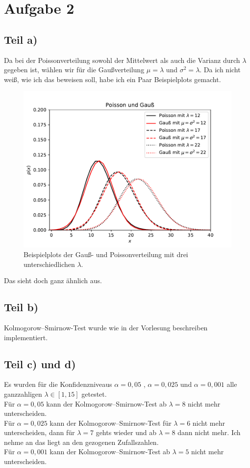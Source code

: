 \section{Aufgabe 2}
\label{sec:Aufgabe2}
\subsection{Teil a)}
Da bei der Poissonverteilung sowohl der Mittelwert als auch die Varianz
durch $\lambda$ gegeben
ist, wählen wir für die Gaußverteilung $\mu=\lambda$ und $\sigma^2=\lambda$.
Da ich nicht weiß, wie ich das beweisen soll, habe ich ein Paar Beispielplots gemacht.
\begin{figure}[H]
  \includegraphics{plots/testplot.pdf}
  \caption{Beispielplots der Gauß- und Poissonverteilung mit drei
            unterschiedlichen $\lambda$.}
\end{figure}
Das sieht doch ganz ähnlich aus.
\subsection{Teil b)}
Kolmogorow–Smirnow-Test wurde wie in der Vorlesung beschreiben implementiert.
\subsection{Teil c) und d) }
Es wurden für die Konfidenzniveaus $\alpha = 0,05 $ , $ \alpha = 0,025 $ und $ \alpha = 0,001 $
alle ganzzahligen $\lambda \in [1,15]$ getestet. \\
Für $\alpha = 0,05$ kann der Kolmogorow–Smirnow-Test ab $\lambda=8$ nicht mehr unterscheiden.\\
Für $\alpha = 0,025$ kann der Kolmogorow–Smirnow-Test für $\lambda=6$ nicht mehr unterscheiden,
dann für $\lambda=7$ gehts wieder und ab $\lambda=8$ dann nicht mehr. Ich nehme an das liegt
an den gezogenen Zufallszahlen.\\
Für $\alpha = 0,001$ kann der Kolmogorow–Smirnow-Test ab $\lambda=5$ nicht mehr unterscheiden.
